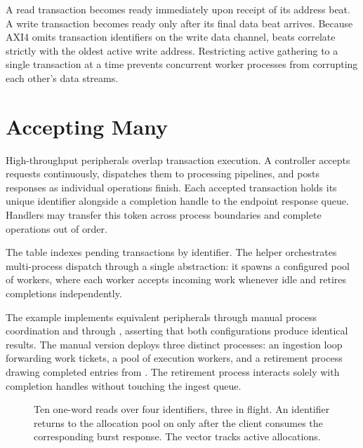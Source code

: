 \documentclass[journal,9pt]{IEEEtran}
\newcommand{\axipart}[3]{%
}
\begin{document}
\axipart{accept}{The peripheral endpoint interface yielding decoded
transactions.}{lst:a-accept}

A read transaction becomes ready immediately upon receipt of its address
beat. A write transaction becomes ready only after its final data beat
arrives. Because AXI4 omits transaction identifiers on the write data
channel, beats correlate strictly with the oldest active write address.
Restricting active gathering to a single transaction at a time prevents
concurrent worker processes from corrupting each other's data streams.

\section{Accepting Many}
\label{sec:a-many}

High-throughput peripherals overlap transaction execution. A controller
accepts requests continuously, dispatches them to processing pipelines, and
posts responses as individual operations finish. Each accepted transaction
holds its unique identifier alongside a completion handle to the endpoint
response queue. Handlers may transfer this token across process boundaries
and complete operations out of order.

The  table indexes pending transactions by identifier. The
 helper orchestrates multi-process dispatch through a single
abstraction: it spawns a configured pool of workers, where each worker
accepts incoming work whenever idle and retires completions independently.

\axipart{serve}{\code{serve} helper orchestrating bus transactions across
concurrent workers.}{lst:a-serve}

The  example implements equivalent peripherals through
manual process coordination and through , asserting that both
configurations produce identical results. The manual version deploys three
distinct processes: an ingestion loop forwarding work tickets, a pool of
execution workers, and a retirement process drawing completed entries from
. The retirement process interacts solely with completion handles
without touching the ingest queue.

\begin{figure}[t]
\centering

\caption{Ten one-word reads over four identifiers, three in flight. An
identifier returns to the allocation pool on  only after the
client consumes the corresponding burst response. The  vector
tracks active allocations.}
\label{fig:a-serve}
\end{figure}
\end{document}
